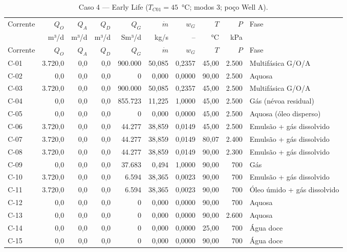 \documentclass[11pt,a4paper]{article}
\numberwithin{equation}{section}
\numberwithin{table}{section}
\numberwithin{figure}{section}
\begin{document}
{\footnotesize\setlength{\tabcolsep}{3pt}\begin{longtable}{lrrrrrrrrL{2.5cm}}
\caption{Caso 4 --- Early Life ($T_{C01}=45$~°C; modos 3; poço Well A).}\\\toprule
Corrente & $Q_O$ & $Q_A$ & $Q_D$ & $Q_G$ & $\dot m$ & $w_G$ & $T$ & $P$ & Fase\\ & m³/d & m³/d & m³/d & Sm³/d & kg/s & -- & °C & kPa & \\\midrule\endfirsthead
\toprule Corrente & $Q_O$ & $Q_A$ & $Q_D$ & $Q_G$ & $\dot m$ & $w_G$ & $T$ & $P$ & Fase\\\midrule\endhead
C-01 & 3.720,0 & 0,0 & 0,0 & 900.000 & 50,085 & 0,2357 & 45,00 & 2.500 & {\scriptsize Multifásica G/O/A}\\
C-02 & 0,0 & 0,0 & 0,0 & 0 & 0,000 & 0,0000 & 90,00 & 2.500 & {\scriptsize Aquosa}\\
C-03 & 3.720,0 & 0,0 & 0,0 & 900.000 & 50,085 & 0,2357 & 45,00 & 2.500 & {\scriptsize Multifásica G/O/A}\\
C-04 & 0,0 & 0,0 & 0,0 & 855.723 & 11,225 & 1,0000 & 45,00 & 2.500 & {\scriptsize Gás (névoa residual)}\\
C-05 & 0,0 & 0,0 & 0,0 & 0 & 0,000 & 0,0000 & 45,00 & 2.500 & {\scriptsize Aquosa (óleo disperso)}\\
C-06 & 3.720,0 & 0,0 & 0,0 & 44.277 & 38,859 & 0,0149 & 45,00 & 2.500 & {\scriptsize Emulsão + gás dissolvido}\\
C-07 & 3.720,0 & 0,0 & 0,0 & 44.277 & 38,859 & 0,0149 & 80,07 & 2.400 & {\scriptsize Emulsão + gás dissolvido}\\
C-08 & 3.720,0 & 0,0 & 0,0 & 44.277 & 38,859 & 0,0149 & 90,00 & 2.300 & {\scriptsize Emulsão + gás dissolvido}\\
C-09 & 0,0 & 0,0 & 0,0 & 37.683 & 0,494 & 1,0000 & 90,00 & 700 & {\scriptsize Gás}\\
C-10 & 3.720,0 & 0,0 & 0,0 & 6.594 & 38,365 & 0,0023 & 90,00 & 700 & {\scriptsize Emulsão + gás dissolvido}\\
C-11 & 3.720,0 & 0,0 & 0,0 & 6.594 & 38,365 & 0,0023 & 90,00 & 700 & {\scriptsize Óleo úmido + gás dissolvido}\\
C-12 & 0,0 & 0,0 & 0,0 & 0 & 0,000 & 0,0000 & 90,00 & 700 & {\scriptsize Aquosa}\\
C-13 & 0,0 & 0,0 & 0,0 & 0 & 0,000 & 0,0000 & 90,00 & 2.600 & {\scriptsize Aquosa}\\
C-14 & 0,0 & 0,0 & 0,0 & 0 & 0,000 & 0,0000 & 25,00 & 700 & {\scriptsize Água doce}\\
C-15 & 0,0 & 0,0 & 0,0 & 0 & 0,000 & 0,0000 & 90,00 & 700 & {\scriptsize Água doce}\\

\end{longtable}}
\end{document}
